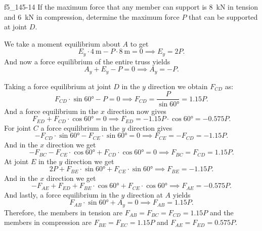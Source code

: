 \begin{problemwithimage}{f5_14}{5-14}
  If the maximum force that any member can support is \qty{8}{\kN} in tension and \qty{6}{\kN} in compression, determine the maximum force $P$ that can be supported at joint $D$.
\end{problemwithimage}

\begin{derivation}
  We take a moment equilibrium about $A$ to get
  \begin{equation*}
    E_y \cdot \qty{4}{\m} - P \cdot \qty{8}{\m} = 0 \implies E_y = 2P
  .\end{equation*}
  And now a force equilibrium of the entire truss yields
  \begin{equation*}
    A_y + E_y - P = 0 \implies A_y = - P
  .\end{equation*}

  Taking a force equilibrium at joint $D$ in the $y$ direction we obtain $F_{CD}$ as:
  \begin{equation*}
    F_{CD} \cdot \sin \ang{60} - P = 0 \implies F_{CD} = \frac{P}{\sin \ang{60 } } = \num{1,15} P
  .\end{equation*}
  And a force equilibrium in the $x$ direction now gives
  \begin{equation*}
    F_{ED} + F_{CD} \cdot \cos \ang{60} = 0 \implies F_{ED} = - \num{1,15} P \cdot \cos \ang{60} = - \num{0,575} P
  .\end{equation*}
  For joint $C$ a force equilibrium in the $y$ direction gives
  \begin{equation*}
    - F_{CD} \cdot \sin \ang{60} - F_{CE} \cdot \sin \ang{60} = 0 \implies F_{CE} = - F_{CD} = - \num{1,15} P
  .\end{equation*}
  And in the $x$ direction we get
  \begin{equation*}
    - F_{BC} - F_{CE} \cdot \cos \ang{60} + F_{CD} \cdot \cos \ang{60} = 0 \implies F_{BC} = F_{CD} = \num{1,15} P
  .\end{equation*}
  At joint $E$ in the $y$ direction we get
  \begin{equation*}
    2 P + F_{BE} \cdot \sin \ang{60} + F_{CE} \cdot \sin \ang{60} \implies F_{BE} = - \num{1,15} P
  .\end{equation*}
  And in the $x$ direction we get
  \begin{equation*}
    - F_{AE} + F_{ED} + F_{BE} \cdot \cos \ang{60} + F_{CE}\cdot \cos \ang{60} \implies F_{AE} = - \num{0,575} P 
  .\end{equation*}
  And lastly, a force equilibrium in the $y$ direction at $A$ yields
  \begin{equation*}
    F_{AB} \cdot \sin \ang{60} + A_y = 0 \implies F_{AB} = \num{1,15} P
  .\end{equation*}
  Therefore, the members in tension are $F_{AB} = F_{BC} = F_{CD} = \num{1,15} P$ and the members in compression are $F_{BE} = F_{EC} = \num{1,15} P$ and $F_{AE} = F_{ED} = \num{0,575}P$.


\end{derivation}
